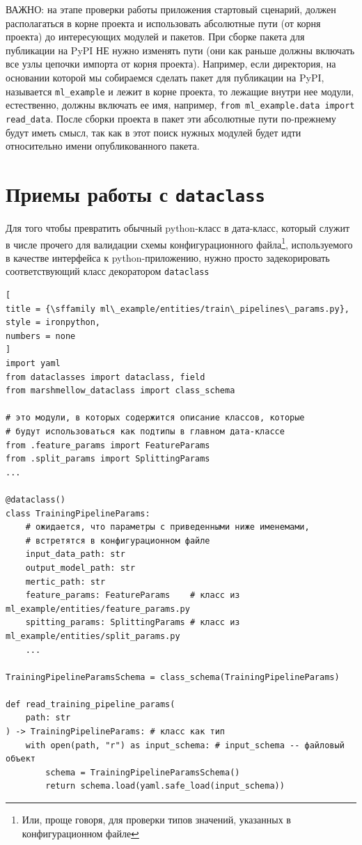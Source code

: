 \documentclass[%
	11pt,
	a4paper,
	utf8,
		]{article}
\begin{document}
ВАЖНО: на этапе проверки работы приложения стартовый сценарий, должен располагаться в корне проекта и использовать абсолютные пути (от корня проекта) до интересующих модулей и пакетов. При сборке пакета для публикации на PyPI НЕ нужно изменять пути (они как раньше должны включать все узлы цепочки импорта от корня проекта). Например, если директория, на основании которой мы собираемся сделать пакет для публикации на PyPI, называется \texttt{ml\_example} и лежит в корне проекта, то лежащие внутри нее модули, естественно, должны включать ее имя, например, \texttt{from ml\_example.data import read\_data}. После сборки проекта в пакет эти абсолютные пути по-прежнему будут иметь смысл, так как в этот поиск нужных модулей будет идти относительно имени опубликованного пакета.


\section{Приемы работы с \texttt{dataclass}}

Для того чтобы превратить обычный python-класс в дата-класс, который служит в числе прочего для валидации схемы конфигурационного файла\footnote{Или, проще говоря, для проверки типов значений, указанных в конфигурационном файле}, используемого в качестве интерфейса к python-приложению, нужно просто задекорировать соответствующий класс декоратором \texttt{dataclass}
\begin{lstlisting}[
title = {\sffamily ml\_example/entities/train\_pipelines\_params.py},
style = ironpython,
numbers = none	
]
import yaml
from dataclasses import dataclass, field
from marshmellow_dataclass import class_schema

# это модули, в которых содержится описание классов, которые
# будут использоваться как подтипы в главном дата-классе
from .feature_params import FeatureParams
from .split_params import SplittingParams
...

@dataclass()
class TrainingPipelineParams:
    # ожидается, что параметры с приведенными ниже именемами,
    # встретятся в конфигурационном файле
    input_data_path: str 
    output_model_path: str
    mertic_path: str
    feature_params: FeatureParams    # класс из ml_example/entities/feature_params.py
    spitting_params: SplittingParams # класс из ml_example/entities/split_params.py
    ...
    
TrainingPipelineParamsSchema = class_schema(TrainingPipelineParams)

def read_training_pipeline_params(
    path: str
) -> TrainingPipelineParams: # класс как тип
    with open(path, "r") as input_schema: # input_schema -- файловый объект
        schema = TrainingPipelineParamsSchema()
        return schema.load(yaml.safe_load(input_schema))
\end{lstlisting}
\end{document}
